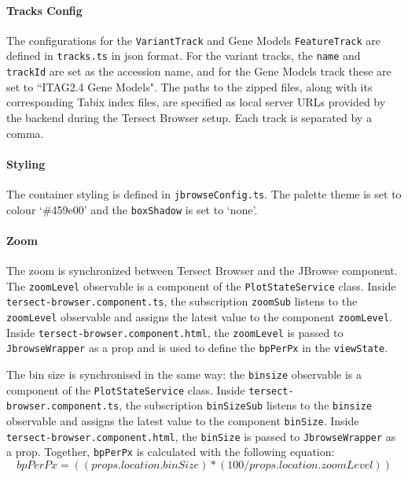 \documentclass[12pt]{article}
\begin{document}
\paragraph{Tracks Config} 
The configurations for the \verb +VariantTrack+ and Gene Models \verb +FeatureTrack+ are defined in \verb +tracks.ts+ in json format. For the variant tracks, the \verb +name+ and \verb +trackId+ are set as the accession name, and for the Gene Models track these are set to ``ITAG2.4 Gene Models".  The paths to the zipped files, along with its corresponding Tabix index files, are specified as local server URLs provided by the backend during the Tersect Browser setup. Each track is separated by a comma. 

\paragraph{Styling}
The container styling is defined in \verb +jbrowseConfig.ts+. The palette theme is set to colour `\#459e00' and the \verb +boxShadow+ is set to `none'. 

\paragraph{Zoom} 
The zoom is synchronized between Tersect Browser and the JBrowse component. The \verb +zoomLevel+ observable is a component of the \verb +PlotStateService+ class. Inside \verb +tersect-browser.component.ts+, the subscription \verb +zoomSub+ listens to the \verb +zoomLevel+ observable and assigns the latest value to the component \verb +zoomLevel+. Inside \verb +tersect-browser.component.html+, the \verb +zoomLevel+ is passed to \verb +JbrowseWrapper+ as a prop and is used to define the \verb +bpPerPx+ in the \verb +viewState+. 

The bin size is synchronised in the same way: the \verb +binsize+ observable is a component of the \verb +PlotStateService+ class. Inside \verb +tersect-browser.component.ts+, the subscription \verb +binSizeSub+ listens to the \verb +binsize+ observable and assigns the latest value to the component \verb +binSize+. Inside \verb +tersect-browser.component.html+, the \verb +binSize+ is passed to \verb +JbrowseWrapper+ as a prop. 
Together, \verb +bpPerPx+ is calculated with the following equation: \begin{equation} bpPerPx = ((props.location.binSize) * (100 /props.location.zoomLevel)) \end{equation}
\end{document}
